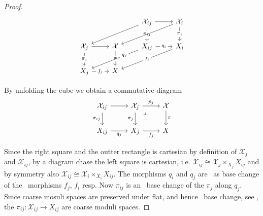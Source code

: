\begin{proof}
	\[\begin{tikzcd}
		&& {\mathcal{X}_{ij}} & {\mathcal{X}_i} \\
		{\mathcal{X}_j} & {\mathcal{X}} & {X_{ij}} & {X_i} \\
		{X_j} & X
		\arrow[from=1-3, to=1-4]
		\arrow[from=1-3, to=2-1]
		\arrow["{\pi_{ij}}"{description}, from=1-3, to=2-3]
		\arrow[from=1-4, to=2-2]
		\arrow["{\pi_i}"{description}, from=1-4, to=2-4]
		\arrow[from=2-1, to=2-2]
		\arrow["{\pi_j}"{description}, from=2-1, to=3-1]
		\arrow["\pi"{description}, from=2-2, to=3-2]
		\arrow["{q_i}"{description}, from=2-3, to=2-4]
		\arrow["{q_j}"{description, pos=0.3}, from=2-3, to=3-1]
		\arrow["{f_i}"{description}, from=2-4, to=3-2]
		\arrow["{f_j}"{description}, from=3-1, to=3-2]
	\end{tikzcd}\]
	
	By unfolding the cube we obtain a commutative diagram 
	\[\begin{tikzcd}
		{\mathcal{X}_{ij}} & {\mathcal{X}_j} & {\mathcal{X}} \\
		{X_{ij}} & {X_j} & X
		\arrow[from=1-1, to=1-2]
		\arrow["{\pi_{ij}}"', from=1-1, to=2-1]
		\arrow["{p_j}", from=1-2, to=1-3]
		\arrow["{\pi_j}"', from=1-2, to=2-2]
		\arrow["\lrcorner"{anchor=center, pos=0.125}, draw=none, from=1-2, to=2-3]
		\arrow["\pi", from=1-3, to=2-3]
		\arrow["{q_j}"', from=2-1, to=2-2]
		\arrow["{f_j}"', from=2-2, to=2-3]
	\end{tikzcd}\]
	
	Since the right square and the outter rectangle is cartesian by definition of $\mathcal{X}_j$ and $\mathcal{X}_{ij}$, by a diagram chase the left square is cartesian, i.e. 
	$\mathcal{X}_{ij} \cong \mathcal{X}_j \times_{X_j} X_{ij}$ and by symmetry also $\mathcal{X}_{ij} \cong \mathcal{X}_i \times_{X_i} X_{ij}$.
	The morphisms $q_i$ and $q_j$ are \etale\ as base change of the \etale\ morphisms $f_j$, $f_i$ resp.
	Now $\pi_{ij}$ is an \etale\ base change of the $\pi_j$ along $q_j$. Since coarse mosuli spaces are preserved under flat, and hence \etale\ base change, see \cite[][Tag 0DUJ]{stacks-project}, the $\pi_{ij}: \mathcal{X}_{ij} \to X_{ij}$ are coarse moduli spaces.
	

\end{proof}
